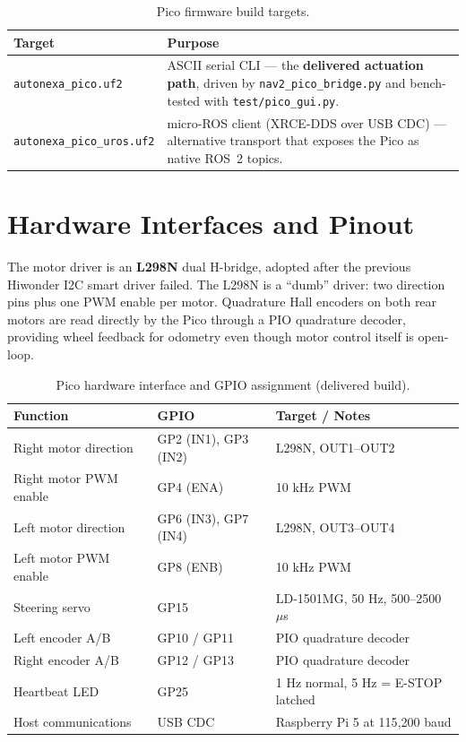 \documentclass[12pt,a4paper]{report}
\begin{document}
\begin{table}[H]
\centering
\caption{Pico firmware build targets.}
\label{tab:pico_builds}
\begin{tabularx}{\textwidth}{|p{4.8cm}|X|}
\hline
\textbf{Target} & \textbf{Purpose} \\
\hline
\texttt{autonexa\_pico.uf2} & ASCII serial CLI --- the \textbf{delivered actuation path}, driven by \texttt{nav2\_pico\_bridge.py} and bench-tested with \texttt{test/pico\_gui.py}. \\
\hline
\texttt{autonexa\_pico\_uros.uf2} & micro-ROS client (XRCE-DDS over USB CDC) --- alternative transport that exposes the Pico as native ROS~2 topics. \\
\hline
\end{tabularx}
\end{table}

\section{Hardware Interfaces and Pinout}

The motor driver is an \textbf{L298N} dual H-bridge, adopted after the previous
Hiwonder I2C smart driver failed. The L298N is a ``dumb'' driver: two direction
pins plus one PWM enable per motor. Quadrature Hall encoders on both rear motors
are read directly by the Pico through a PIO quadrature decoder, providing wheel
feedback for odometry even though motor control itself is open-loop.

\begin{table}[H]
\centering
\caption{Pico hardware interface and GPIO assignment (delivered build).}
\label{tab:pico_hw}
\begin{tabularx}{\textwidth}{|p{3.2cm}|p{3.6cm}|X|}
\hline
\textbf{Function} & \textbf{GPIO} & \textbf{Target / Notes} \\
\hline
Right motor direction & GP2 (IN1), GP3 (IN2) & L298N, OUT1--OUT2 \\
\hline
Right motor PWM enable & GP4 (ENA) & 10 kHz PWM \\
\hline
Left motor direction & GP6 (IN3), GP7 (IN4) & L298N, OUT3--OUT4 \\
\hline
Left motor PWM enable & GP8 (ENB) & 10 kHz PWM \\
\hline
Steering servo & GP15 & LD-1501MG, 50 Hz, 500--2500 $\mu$s \\
\hline
Left encoder A/B & GP10 / GP11 & PIO quadrature decoder \\
\hline
Right encoder A/B & GP12 / GP13 & PIO quadrature decoder \\
\hline
Heartbeat LED & GP25 & 1 Hz normal, 5 Hz = E-STOP latched \\
\hline
Host communications & USB CDC & Raspberry Pi 5 at 115{,}200 baud \\
\hline
\end{tabularx}
\end{table}
\end{document}
